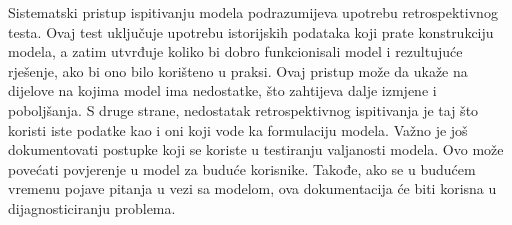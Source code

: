 \documentclass[a4paper, utf8, 11pt, colorlinks]{book}
\begin{document}
Sistematski pristup ispitivanju modela podrazumijeva upotrebu retrospektivnog testa. Ovaj test uključuje upotrebu istorijskih podataka koji prate konstrukciju modela, a zatim utvrđuje koliko bi dobro funkcionisali model i rezultujuće rješenje, ako bi ono  bilo korišteno u praksi.  Ovaj pristup može da ukaže na dijelove na kojima model ima nedostatke, što zahtijeva dalje izmjene i poboljšanja. 
S druge strane, nedostatak retrospektivnog ispitivanja je taj što koristi iste podatke kao i oni koji vode ka formulaciju modela. %
Važno je još dokumentovati postupke koji se koriste u testiranju valjanosti modela. Ovo može  povećati povjerenje u model za buduće korisnike. Takođe, ako se u budućem vremenu pojave pitanja u vezi sa modelom, ova dokumentacija će  biti korisna u dijagnosticiranju problema. 

\end{document}
